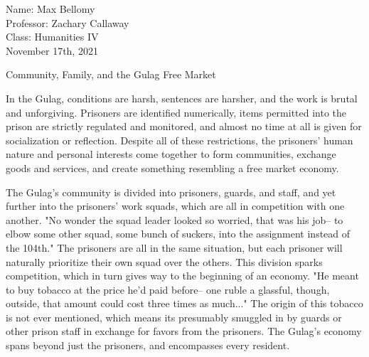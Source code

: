 \documentclass[12pt]{article}
\begin{document}
\begin{flushleft}

Name: Max Bellomy\\
Professor: Zachary Callaway\\
Class: Humanities IV\\
November 17th, 2021\\

\begin{center}
Community, Family, and the Gulag Free Market
\end{center}


\setlength{\parindent}{0.5in}


In the Gulag, conditions are harsh, sentences are harsher, and the work is brutal and unforgiving.
Prisoners are identified numerically, items permitted into the prison are strictly regulated and monitored, and almost no time at all is given for socialization or reflection.
Despite all of these restrictions, the prisoners' human nature and personal interests come together to form communities, exchange goods and services, and create something resembling a free market economy.

The Gulag's community is divided into prisoners, guards, and staff, and yet further into the prisoners' work squads, which are all in competition with one another.
"No wonder the squad leader looked so worried, that was his job-- to elbow some other squad, some bunch of suckers, into the assignment instead of the 104th."\footnotemark
The prisoners are all in the same situation, but each prisoner will naturally prioritize their own squad over the others.
This division sparks competition, which in turn gives way to the beginning of an economy.
"He meant to buy tobacco at the price he'd paid before-- one ruble a glassful, though, outside, that amount could cost three times as much..."\footnotemark  
The origin of this tobacco is not ever mentioned, which means its presumably smuggled in by guards or other prison staff in exchange for favors from the prisoners.
The Gulag's economy spans beyond just the prisoners, and encompasses every resident.



\end{flushleft}
\end{document}
